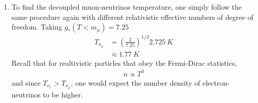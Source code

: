 \begin{enumerate}[label=\alph*)]
\item To find the decoupled muon-neutrinos temperature, one simply follow the same procedure again with different relativistic effective numbers of degree of freedom. Taking $g_{\ast} (T<m_{\mu})=  7.25$ 
\begin{align}
T_{\nu_\mu} &= \left(\frac{2}{7.25}\right)^{1/3}\SI{2.725}{K}\\
&\approx \SI{1.77}{K}
\end{align}
Recall that for realtivistic particles that obey the Fermi-Dirac statistics, 
\begin{align}
n \propto T^3
\end{align}
and since $T_{\nu_e} > T_{\nu_\mu}$, one would expect the number density of electron-neutrinos to be higher.


\end{enumerate}
